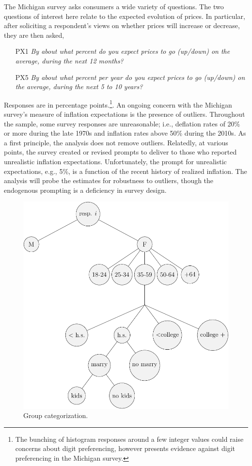 \documentclass[12pt]{article}
\begin{document}
The Michigan survey asks consumers a wide variety of questions. The two questions of interest here relate to the expected evolution of prices. In particular, after soliciting a respondent's views on whether prices will increase or decrease, they are then asked,
\begin{enumerate}
\item[PX1] \emph{By about what percent do you expect prices to go (up/down) on the average, during the next 12 months?}
\item[PX5] \emph{By about what percent per year do you expect prices to go (up/down) on the average, during the next 5 to 10 years?}
\end{enumerate}
Responses are in percentage points.\footnote{The bunching of histogram responses around a few integer values could raise concerns about digit preferencing, however \cite{Branch:JEDC2007} presents evidence against digit preferencing in the Michigan survey.}. An ongoing concern with the Michigan survey's measure of inflation expectations is the presence of outliers. Throughout the sample, some survey responses are unreasonable; i.e., deflation rates of 20\% or more during the late 1970s and inflation rates above 50\% during the 2010s. As a first principle, the analysis does not remove outliers. Relatedly, at various points, the survey created or revised prompts to deliver to those who reported unrealistic inflation expectations. Unfortunately, the prompt for unrealistic expectations, e.g., 5\%, is a function of the recent history of realized inflation. The analysis will probe the estimates for robustness to outliers, though the endogenous prompting is a deficiency in survey design.

\begin{figure}
\centering
\caption{Group categorization.}\label{fig:GroupTree}
\includegraphics[height = \textwidth, width = \textwidth]{figs/GroupCat}
\end{figure}
\end{document}
